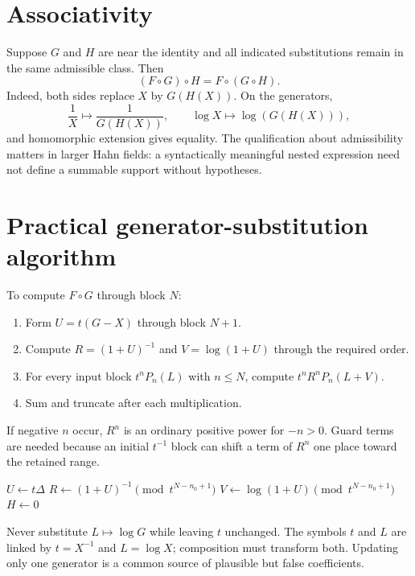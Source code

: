\documentclass[11pt,oneside]{book}
\theoremstyle{definition}
\theoremstyle{remark}
\newcommand{\compose}{\mathbin{\circ}}
\begin{document}
\section{Associativity}
Suppose $G$ and $H$ are near the identity and all indicated substitutions
remain in the same admissible class.  Then
\begin{equation}\label{eq:composition-associativity}
 (F\compose G)\compose H=F\compose(G\compose H).
\end{equation}
Indeed, both sides replace $X$ by $G(H(X))$.  On the generators,
\[
 \frac1X\mapsto\frac1{G(H(X))},
 \qquad
 \log X\mapsto\log(G(H(X))),
\]
and homomorphic extension gives equality.  The qualification about
admissibility matters in larger Hahn fields: a syntactically meaningful
nested expression need not define a summable support without hypotheses.

\section{Practical generator-substitution algorithm}
To compute $F\compose G$ through block $N$:
\begin{enumerate}
\item Form $U=t(G-X)$ through block $N+1$.
\item Compute $R=(1+U)^{-1}$ and $V=\log(1+U)$ through the required order.
\item For every input block $t^nP_n(L)$ with $n\le N$, compute
      $t^nR^nP_n(L+V)$.
\item Sum and truncate after each multiplication.
\end{enumerate}
If negative $n$ occur, $R^n$ is an ordinary positive power for $-n>0$.
Guard terms are needed because an initial $t^{-1}$ block can shift a term of
$R^n$ one place toward the retained range.

\begin{algorithm}[H]
\caption{Near-identity composition through outer block $N$}
\label{alg:generator-composition}
\KwOut{$F\compose G\pmod{t^{N+1}}$}
$U\leftarrow t\Delta$\;
$R\leftarrow(1+U)^{-1}\pmod{t^{N-n_0+1}}$\;
$V\leftarrow\log(1+U)\pmod{t^{N-n_0+1}}$\;
$H\leftarrow0$\;
\;
\end{algorithm}

\begin{pitfallbox}
Never substitute $L\mapsto\log G$ while leaving $t$ unchanged.  The symbols
$t$ and $L$ are linked by $t=X^{-1}$ and $L=\log X$; composition must transform
both.  Updating only one generator is a common source of plausible but false
coefficients.
\end{pitfallbox}
\end{document}
